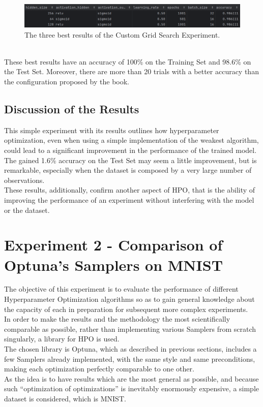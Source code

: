 \begin{figure}[b]
	\centering
	\includegraphics[width=15cm]{figures/figure-4.1.2.png}
	\caption[Best Results of Custom Grid Search Experiment]{The three best results of the Custom Grid Search Experiment.}
	\label{fig:figure-4.1.2}
\end{figure}
\\[0.3cm]These best results have an accuracy of 100\% on the Training Set and 98.6\% on the Test Set. Moreover, there are more than 20 trials with a better accuracy than the configuration proposed by the book.

\subsection{Discussion of the Results}

This simple experiment with its results outlines how hyperparameter optimization, even when using a simple implementation of the weakest algorithm, could lead to a significant improvement in the performance of the trained model.
\\[0.3cm]The gained 1.6\% accuracy on the Test Set may seem a little improvement, but is remarkable, especially when the dataset is composed by a very large number of observations.
\\[0.3cm]These results, additionally, confirm another aspect of HPO, that is the ability of improving the performance of an experiment without interfering with the model or the dataset.

\section{Experiment 2 - Comparison of Optuna's Samplers on MNIST}\label{sec:Experiment2-4.2}

The objective of this experiment is to evaluate the performance of different Hyperparameter Optimization algorithms so as to gain general knowledge about the capacity of each in preparation for subsequent more complex experiments.
\\[0.3cm]In order to make the results and the methodology the most scientifically comparable as possible, rather than implementing various Samplers from scratch singularly, a library for HPO is used.
\\[0.3cm]The chosen library is Optuna, which as described in previous sections, includes a few Samplers already implemented, with the same style and same preconditions, making each optimization perfectly comparable to one other.
\\[0.3cm]As the idea is to have results which are the most general as possible, and because such “optimization of optimizations” is inevitably enormously expensive, a simple dataset is considered, which is MNIST.

